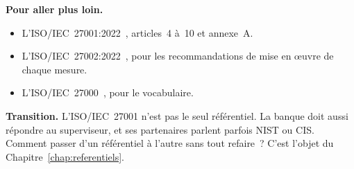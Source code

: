 \bigskip

\begin{boxinfo}
\textbf{Pour aller plus loin.}
\begin{itemize}
    \item L'ISO/IEC~27001:2022~\cite{iso27001_2022}, articles~4 à~10 et
          annexe~A.
    \item L'ISO/IEC~27002:2022~\cite{iso27002_2022}, pour les recommandations
          de mise en œuvre de chaque mesure.
    \item L'ISO/IEC~27000~\cite{iso27000_2018}, pour le vocabulaire.
\end{itemize}
\end{boxinfo}

\begin{boxinfo}
\textbf{Transition.} L'ISO/IEC~27001 n'est pas le seul référentiel. La
banque doit aussi répondre au superviseur, et ses partenaires parlent
parfois NIST ou CIS. Comment passer d'un référentiel à l'autre sans tout
refaire~? C'est l'objet du Chapitre~\ref{chap:referentiels}.
\end{boxinfo}
